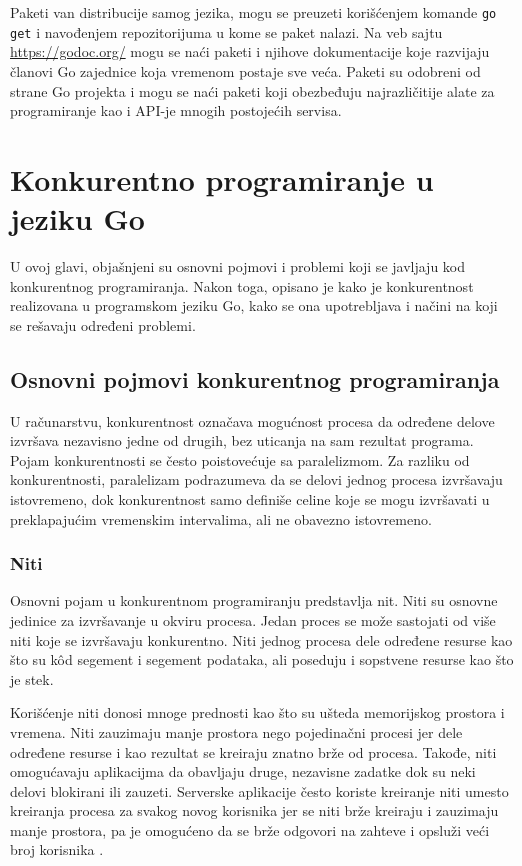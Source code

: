 \documentclass[12pt,oneside]{memoir}
\begin{document}
Paketi van distribucije samog jezika, mogu se preuzeti korišćenjem komande \texttt{go get} i navođenjem repozitorijuma u kome se paket nalazi. Na veb sajtu \url{https://godoc.org/} mogu se naći paketi i njihove dokumentacije koje razvijaju članovi Go zajednice koja vremenom postaje sve veća. Paketi su odobreni od strane Go projekta i mogu se naći paketi koji obezbeđuju najrazličitije alate za programiranje kao i API-je mnogih postojećih servisa.


\chapter{Konkurentno programiranje u jeziku Go} \label{conc}

U ovoj glavi, objašnjeni su osnovni pojmovi i problemi koji se javljaju kod konkurentnog programiranja. Nakon toga, opisano je kako je konkurentnost realizovana u programskom jeziku Go, kako se ona upotrebljava i načini na koji se rešavaju određeni problemi. 

\section{Osnovni pojmovi konkurentnog programiranja}

U računarstvu, konkurentnost označava mogućnost procesa da određene delove izvršava nezavisno jedne od drugih, bez uticanja na sam rezultat programa. Pojam konkurentnosti se često poistovećuje sa paralelizmom. Za razliku od konkurentnosti, paralelizam podrazumeva da se delovi jednog procesa izvršavaju istovremeno, dok konkurentnost samo definiše celine koje se mogu izvršavati u preklapajućim vremenskim intervalima, ali ne obavezno istovremeno. 

\subsection{Niti}

Osnovni pojam u konkurentnom programiranju predstavlja nit. Niti su osnovne jedinice za izvršavanje u okviru procesa. Jedan proces se može sastojati od više niti koje se izvršavaju konkurentno. Niti jednog procesa dele određene resurse kao što su k\^{o}d segement i segement podataka, ali poseduju i sopstvene resurse kao što je stek. 

Korišćenje niti donosi mnoge prednosti kao što su ušteda memorijskog prostora i vremena. Niti zauzimaju manje prostora nego pojedinačni procesi jer dele određene resurse i kao rezultat se kreiraju znatno brže od procesa. Takođe, niti omogućavaju aplikacijma da obavljaju druge, nezavisne zadatke dok su neki delovi blokirani ili zauzeti. Serverske aplikacije često koriste kreiranje niti umesto kreiranja procesa za svakog novog korisnika jer se niti brže kreiraju i zauzimaju manje prostora, pa je omogućeno da se brže odgovori na zahteve i opsluži veći broj korisnika \cite{os}.  
\end{document}
